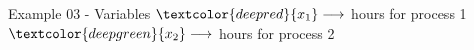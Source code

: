 \begin{frame}{Example 03 - Variables}
\Huge{
$\textcolor{deepred}  {{x}_{1}} \longrightarrow$
    hours for process 1 \\ \vspace{1cm}
$\textcolor{deepgreen}{{x}_{2}} \longrightarrow$
    hours for process 2
}
\end{frame}
